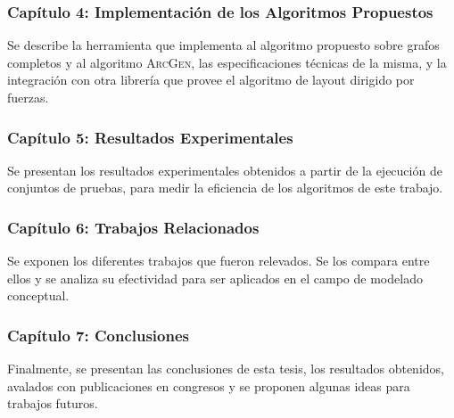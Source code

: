 \subsubsection{Capítulo 4: Implementación de los Algoritmos Propuestos}
Se describe la herramienta  que implementa al algoritmo propuesto  sobre grafos completos y al algoritmo \textsc{ArcGen}, las especificaciones técnicas de la misma, y la integración con otra librería que provee el algoritmo de layout dirigido por fuerzas.

\subsubsection{Capítulo 5: Resultados Experimentales}
Se presentan los resultados experimentales obtenidos a partir de la ejecución de conjuntos de pruebas, para medir la eficiencia de los algoritmos de este trabajo.

\subsubsection{Capítulo 6: Trabajos Relacionados}
Se exponen los diferentes trabajos que fueron relevados. Se los compara entre ellos y se analiza su efectividad para ser aplicados en el campo de modelado conceptual.

\subsubsection{Capítulo 7: Conclusiones}
 Finalmente, se presentan las conclusiones de esta tesis, los resultados obtenidos, avalados con publicaciones en congresos y se proponen algunas ideas para trabajos futuros.

